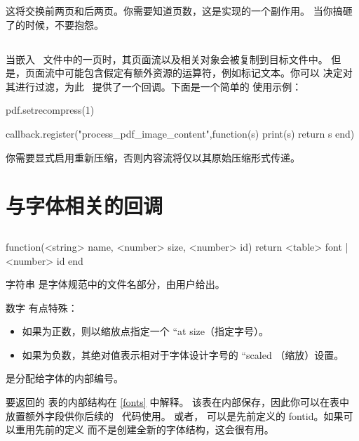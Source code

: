 这将交换前两页和后两页。你需要知道页数，这是实现的一个副作用。
当你搞砸了的时候，不要抱怨。

\subsection{}


当嵌入 \PDF\ 文件中的一页时，其页面流以及相关对象会被复制到目标文件中。
但是，页面流中可能包含假定有额外资源的运算符，例如标记文本。你可以
决定对其进行过滤，为此 \LUATEX\ 提供了一个回调。下面是一个简单的
使用示例：

\begin{typing}
pdf.setrecompress(1)

callback.register("process_pdf_image_content",function(s)
    print(s)
    return s
end)
\end{typing}

你需要显式启用重新压缩，否则内容流将仅以其原始压缩形式传递。

\section{与字体相关的回调}

\subsection{}


\begin{typing}
function(<string> name, <number> size, <number> id)
    return <table> font | <number> id
end
\end{typing}

字符串  是字体规范中的文件名部分，由用户给出。

数字  有点特殊：

\begin{itemize}
\item 如果为正数，则以缩放点指定一个 ``at size（指定字号）。

\item 如果为负数，其绝对值表示相对于字体设计字号的 ``scaled
    （缩放）设置。

\end{itemize}

 是分配给字体的内部编号。

要返回的  表的内部结构在 \ref{fonts} 中解释。
该表在内部保存，因此你可以在表中放置额外字段供你后续的 \LUA\ 代码使用。
或者， 可以是先前定义的 fontid。如果可以重用先前的定义
而不是创建全新的字体结构，这会很有用。


